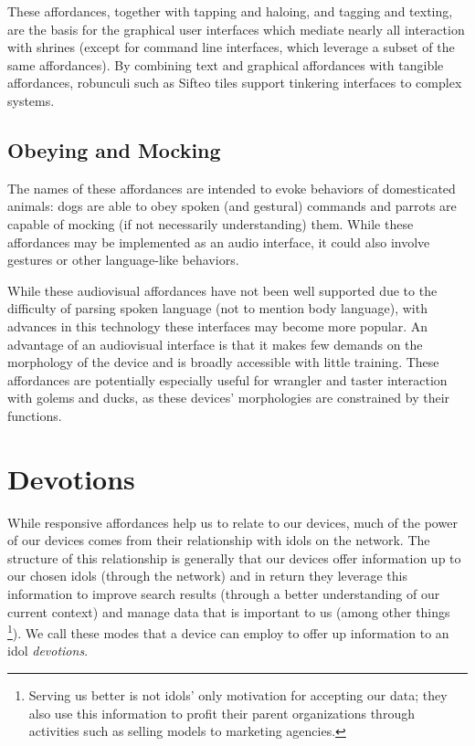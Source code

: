 These affordances, together with tapping and haloing, and tagging and texting, are the basis for the graphical user interfaces which mediate nearly all interaction with shrines (except for command line interfaces, which leverage a subset of the same affordances). By combining text and graphical affordances with tangible affordances, robunculi such as Sifteo tiles support tinkering interfaces to complex systems.

\subsection{Obeying and Mocking}
%
The names of these affordances are intended to evoke behaviors of domesticated animals: dogs are able to obey spoken (and gestural) commands and parrots are capable of mocking (if not necessarily understanding) them. While these affordances may be implemented as an audio interface, it could also involve gestures or other language-like behaviors.

While these audiovisual affordances have not been well supported due to the difficulty of parsing spoken language (not to mention body language), with advances in this technology these interfaces may become more popular. An advantage of an audiovisual interface is that it makes few demands on the morphology of the device and is broadly accessible with little training. These affordances are potentially especially useful for wrangler and taster interaction with golems and ducks, as these devices' morphologies are constrained by their functions.

\section{Devotions}
\label{sec:devotions}
%
While responsive affordances help us to relate to our devices, much of the power of our devices comes from their relationship with idols on the network. 
The structure of this relationship is generally that our devices offer information up to our chosen idols (through the network) and in return they leverage this information to improve search results (through a better understanding of our current context) and manage data that is important to us (among other things%
\footnote{Serving us better is not idols' only motivation for accepting our data; they also use this information to profit their parent organizations through activities such as selling models to marketing agencies.}).
We call these modes that a device can employ to offer up information to an idol \emph{devotions}.

